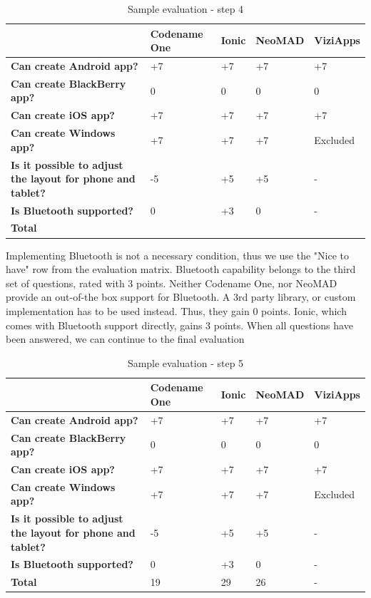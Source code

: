 \documentclass[english,master,public,dept460,male,cpdeclaration,oneside]{diploma}
\begin{document}
\begin{table}[!h]
	\centering
	\caption{Sample evaluation - step 4}
	\label{table:sampleEvaluation4}
	\begin{tabular}{p{2.5cm} | p{2.5cm} | p{2.5cm} | p{2.5cm} | p{2.5cm}}
		\toprule
		& \textbf{Codename One} & \textbf{Ionic} & \textbf{NeoMAD} & \textbf{ViziApps} \\
		\midrule
		\textbf{Can create Android app?} & +7 & +7 & +7 & +7 \\
		\textbf{Can create BlackBerry app?} & 0 & 0 & 0 & 0 \\
		\textbf{Can create iOS app?} & +7 & +7 & +7 & +7 \\
		\textbf{Can create Windows app?} & +7 & +7 & +7 & Excluded \\
		\midrule
		\textbf{Is it possible to adjust the layout for phone and tablet?} & -5 & +5 & +5 & - \\
		\midrule
		\textbf{Is Bluetooth supported?} & 0 & +3 & 0 & - \\
		\midrule
		\textbf{Total} &&&& \\
		\midrule
	\end{tabular}
\end{table}

Implementing Bluetooth is not a necessary condition, thus we use the "Nice to have" row from the evaluation matrix. Bluetooth capability belongs to the third set of questions, rated with 3 points. Neither Codename One, nor NeoMAD provide an out-of-the box support for Bluetooth. A 3rd party library, or custom implementation has to be used instead. Thus, they gain 0 points. Ionic, which comes with Bluetooth support directly, gains 3 points. When all questions have been answered, we can continue to the final evaluation

\begin{table}[!h]
	\centering
	\caption{Sample evaluation - step 5}
	\label{table:sampleEvaluation5}
	\begin{tabular}{p{2.5cm} | p{2.5cm} | p{2.5cm} | p{2.5cm} | p{2.5cm}}
		\toprule
		& \textbf{Codename One} & \textbf{Ionic} & \textbf{NeoMAD} & \textbf{ViziApps} \\
		\midrule
		\textbf{Can create Android app?} & +7 & +7 & +7 & +7 \\
		\textbf{Can create BlackBerry app?} & 0 & 0 & 0 & 0 \\
		\textbf{Can create iOS app?} & +7 & +7 & +7 & +7 \\
		\textbf{Can create Windows app?} & +7 & +7 & +7 & Excluded \\
		\midrule
		\textbf{Is it possible to adjust the layout for phone and tablet?} & -5 & +5 & +5 & - \\
		\midrule
		\textbf{Is Bluetooth supported?} & 0 & +3 & 0 & - \\
		\midrule
		\textbf{Total} & 19 & 29 & 26 & - \\
		\midrule
	\end{tabular}
\end{table}
\end{document}
